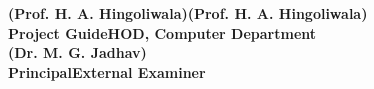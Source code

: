 \begin{spacing}{0}
\vspace{2.0cm}
\large{\textbf{(Prof. H. A. Hingoliwala)}}\hspace*{1.9in}\large{\textbf{(Prof. H. A. Hingoliwala)}}\\
\hspace*{0.7in}\textbf{Project Guide}\hspace*{2.2in}\textbf{HOD, Computer Department}\\[2.5cm]
\hspace*{0.5in}\large{\textbf{(Dr. M. G. Jadhav)}}\\
\hspace*{0.9in}\textbf{Principal}\hspace*{2.8in}\textbf{External Examiner}\\[0.5cm]
\end{spacing}
\newpage